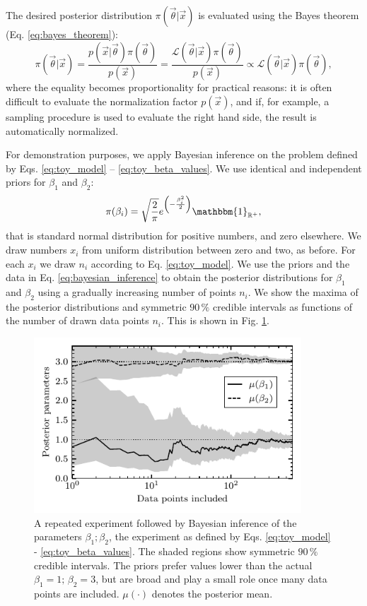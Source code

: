 The desired posterior distribution $\pi(\vec{\theta}|\vec{x})$ is evaluated using the Bayes theorem (Eq. \ref{eq:bayes_theorem}):
\begin{equation}
    \pi(\vec{\theta}|\vec{x}) = \frac{p(\vec{x}|\vec{\theta}) \pi(\vec{\theta})}{p(\vec{x})} = \frac{\mathcal{L}(\vec{\theta}|\vec{x}) \pi(\vec{\theta})}{p(\vec{x})} \propto \mathcal{L}(\vec{\theta}|\vec{x}) \pi(\vec{\theta}),
    \label{eq:bayesian_inference}
\end{equation}
where the equality becomes proportionality for practical reasons: it is often difficult to evaluate the normalization factor $p(\vec{x})$, and if, for example, a sampling procedure is used to evaluate the right hand side, the result is automatically normalized. 

For demonstration purposes, we apply Bayesian inference on the problem defined by Eqs. \ref{eq:toy_model} -- \ref{eq:toy_beta_values}. We use identical and independent priors for $\beta_1$ and $\beta_2$:
\begin{equation}
    \pi(\beta_i) = \sqrt{\frac{2}{\pi}} e^{\left(-\frac{\beta_i^2}{2}\right)} \mathbbm{1}_{\mathbb{R}^+} ,
\end{equation}
that is standard normal distribution for positive numbers, and zero elsewhere. We draw numbers $x_i$ from uniform distribution between zero and two, as before. For each $x_i$ we draw $n_i$ according to Eq. \ref{eq:toy_model}. We use the priors and the data in Eq. \ref{eq:bayesian_inference} to obtain the posterior distributions for $\beta_1$ and $\beta_2$ using a gradually increasing number of points $n_i$. We show the maxima of the posterior distributions and symmetric $90 \, \%$ credible intervals as functions of the number of drawn data points $n_i$. This is shown in Fig. \ref{fig:bayesian_demosntration}.

\begin{figure}[h]
 	\centering
 	\includegraphics[width=10cm]{figures/bayesian.pdf}
 	\caption{A repeated experiment followed by Bayesian inference of the parameters $\beta_1; \beta_2$, the experiment as defined by Eqs. \ref{eq:toy_model} - \ref{eq:toy_beta_values}. The shaded regions show symmetric $90 \, \%$ credible intervals. The priors prefer values lower than the actual $\beta_1=1;\,\beta_2=3$, but are broad and play a small role once many data points are included. $\mu(\cdot)$ denotes the posterior mean.}
 	\label{fig:bayesian_demosntration}
\end{figure}

